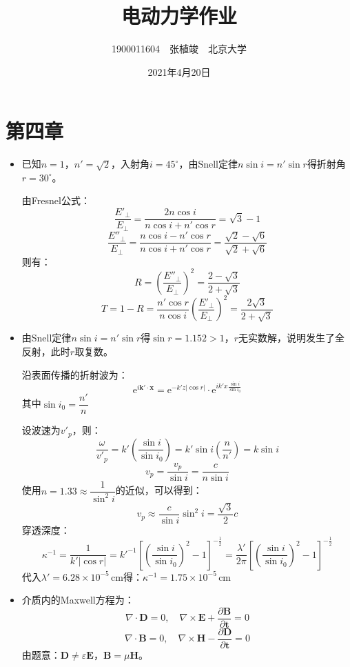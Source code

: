 \documentclass[a4paper,fontset=none]{ctexart}
\begin{document}
    \title{\textbf{电动力学作业}}
    \author{1900011604\ \ 张植竣\ \ 北京大学}
    \date{2021年4月20日}
    \maketitle

    \section*{第四章}

    \begin{itemize}

    \item[2.]
    已知$n=1$，$n'=\sqrt{2}$，入射角$i=45^\circ$，由Snell定律$n\sin i=n'\sin r$得折射角$r=30^\circ$。

    由Fresnel公式：
    \[
        \frac{E'_\perp}{E_\perp} = \frac{2n\cos i}{n\cos i + n'\cos r} = \sqrt{3}-1
    \]
    \[
        \frac{E''_\perp}{E_\perp} = \frac{n\cos i-n'\cos r}{n\cos i + n'\cos r} = \frac{\sqrt{2}-\sqrt{6}}{\sqrt{2}+\sqrt{6}}
    \]
    则有：
    \[
        R = \left(\frac{E''_\perp}{E_\perp}\right)^2 = \frac{2-\sqrt{3}}{2+\sqrt{3}}
    \]
    \[
        T = 1 - R = \frac{n'\cos r}{n\cos i}\left(\frac{E'_\perp}{E_\perp}\right)^2 = \frac{2\sqrt{3}}{2+\sqrt{3}}
    \]

    \item[3.]
    由Snell定律$n\sin i=n'\sin r$得$\sin r=1.152>1$，$r$无实数解，说明发生了全反射，此时$r$取复数。

    沿表面传播的折射波为：
    \[
        \mathrm{e}^{i\bm{k}'\cdot\bm{x}} = \mathrm{e}^{-k'z|\cos r|} \cdot \mathrm{e}^{ik'x\tfrac{\sin i}{\sin i_0}}
    \]
    其中$\sin i_0=\dfrac{n'}{n}$

    设波速为$v'_p$，则：
    \[
        \frac{\omega}{v'_p} = k'\left(\frac{\sin i}{\sin i_0}\right) = k'\sin i\left(\frac{n}{n'}\right) = k\sin i
    \]
    \[
        v_p = \frac{v_p}{\sin i} = \frac{c}{n\sin i}
    \]
    使用$n=1.33\approx\dfrac{1}{\sin^2 i}$的近似，可以得到：
    \[
        v_p \approx \dfrac{c}{\sin i}\sin^2 i = \frac{\sqrt{3}}{2}c
    \]
    穿透深度：
    \[
        \kappa^{-1} = \frac{1}{k'|\cos r|} = k'^{-1}\left[\left(\frac{\sin i}{\sin i_0}\right)^2-1\right]^{-\tfrac{1}{2}} = \frac{\lambda'}{2\pi}\left[\left(\frac{\sin i}{\sin i_0}\right)^2-1\right]^{-\tfrac{1}{2}}
    \]
    代入$\lambda'=6.28\times10^{-5}\,\mathrm{cm}$得：$\kappa^{-1}=1.75\times10^{-5}\,\mathrm{cm}$

    \item[4.]
    介质内的Maxwell方程为：
    \[
        \nabla\cdot\bm{D} = 0,\quad \nabla\times\bm{E} + \frac{\partial\bm{B}}{\partial\bm{t}} = 0
    \]
    \[
        \nabla\cdot\bm{B} = 0,\quad \nabla\times\bm{H} - \frac{\partial\bm{D}}{\partial\bm{t}} = 0
    \]
    由题意：$\bm{D}\neq\varepsilon\bm{E}$，$\bm{B}=\mu\bm{H}$。


\end{itemize}
\end{document}
